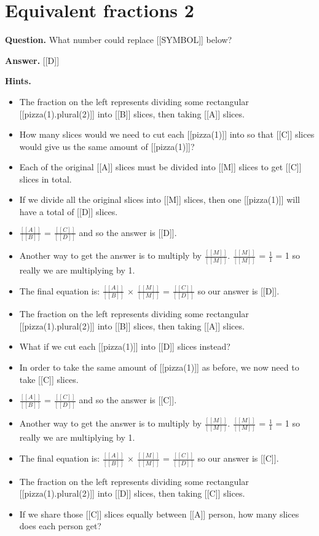\documentclass{article}
\begin{document}
\section*{Equivalent fractions 2}
\textbf{Question.} What number could replace [[SYMBOL]] below?

\textbf{Answer.} [[D]]

\textbf{Hints.}
\begin{itemize}
  \item The fraction on the left represents dividing some rectangular [[pizza(1).plural(2)]] into [[B]] slices,
                            then taking [[A]] slices.
  \item How many slices would we need to cut each [[pizza(1)]] into so that [[C]]
                            slices would give us the same amount of [[pizza(1)]]?
  \item Each of the original [[A]] slices must be divided into [[M]]
                            slices to get [[C]] slices in total.
  \item If we divide all the original slices into [[M]] slices, then one
                            [[pizza(1)]] will have a total of [[D]] slices.
  \item $\frac{[[A]]}{[[B]]}$ = $\frac{[[C]]}{[[D]]}$ and so the answer is [[D]].
  \item Another way to get the answer is to multiply by $\frac{[[M]]}{[[M]]}$.
                        $\frac{[[M]]}{[[M]]}$ = $\frac{1}{1}$ = 1 so really we are multiplying by 1.
  \item The final equation is: $\frac{[[A]]}{[[B]]}$ $\times$ $\frac{[[M]]}{[[M]]}$ =
                        $\frac{[[C]]}{[[D]]}$  so our answer is [[D]].
  \item The fraction on the left represents dividing some rectangular [[pizza(1).plural(2)]] into [[B]] slices,
                            then taking [[A]] slices.
  \item What if we cut each [[pizza(1)]] into [[D]] slices instead?
  \item In order to take the same amount of [[pizza(1)]] as before,
                            we now need to take [[C]] slices.
  \item $\frac{[[A]]}{[[B]]}$ = $\frac{[[C]]}{[[D]]}$ and so the answer is [[C]].
  \item Another way to get the answer is to multiply by $\frac{[[M]]}{[[M]]}$.
                        $\frac{[[M]]}{[[M]]}$ = $\frac{1}{1}$ = 1 so really we are multiplying by 1.
  \item The final equation is: $\frac{[[A]]}{[[B]]}$ $\times$ $\frac{[[M]]}{[[M]]}$ =
                        $\frac{[[C]]}{[[D]]}$  so our answer is [[C]].
  \item The fraction on the left represents dividing some rectangular [[pizza(1).plural(2)]] into [[D]] slices,
                            then taking [[C]] slices.
  \item If we share those [[C]] slices equally between [[A]] person,
                            how many slices does each person get?
                        

\end{itemize}
\end{document}
